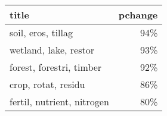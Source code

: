 \begin{tabular}{p{1.2cm}r}
\toprule
                      title &  pchange \\
\midrule
         soil, eros, tillag &      94\% \\
      wetland, lake, restor &      93\% \\
   forest, forestri, timber &      92\% \\
        crop, rotat, residu &      86\% \\
 fertil, nutrient, nitrogen &      80\% \\
\bottomrule
\end{tabular}
